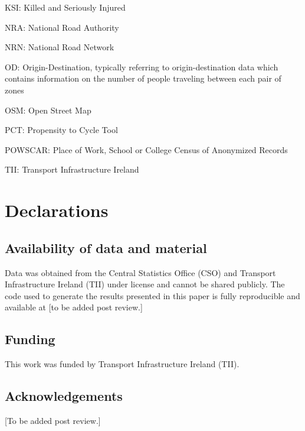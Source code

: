 \documentclass[
  super,
  preprint,
  3p]{elsarticle}
\providecommand{\DIFaddbegin}{} %
\providecommand{\DIFaddend}{} %
\providecommand{\DIFdelbegin}{} %
\providecommand{\DIFdelend}{} %
\newcommand{\DIFscaledelfig}{0.5}
\newlength{\DIFdelgraphicswidth} %
\newlength{\DIFdelgraphicsheight} %
\newcommand{\DIFaddincludegraphics}[2][]{{\color{blue}\fbox{\DIFOincludegraphics[#1]{#2}}}} %
\newcommand{\DIFdelincludegraphics}[2][]{%
\sbox{\DIFdelgraphicsbox}{\DIFOincludegraphics[#1]{#2}}%
\settoboxwidth{\DIFdelgraphicswidth}{\DIFdelgraphicsbox} %
\settoboxtotalheight{\DIFdelgraphicsheight}{\DIFdelgraphicsbox} %
\scalebox{\DIFscaledelfig}{%
\parbox[b]{\DIFdelgraphicswidth}{\usebox{\DIFdelgraphicsbox}\\[-\baselineskip] \rule{\DIFdelgraphicswidth}{0em}}\llap{\resizebox{\DIFdelgraphicswidth}{\DIFdelgraphicsheight}{%
\setlength{\unitlength}{\DIFdelgraphicswidth}%
\begin{picture}(1,1)%
\thicklines\linethickness{2pt} %
{\color[rgb]{1,0,0}\put(0,0){\framebox(1,1){}}}%
{\color[rgb]{1,0,0}\put(0,0){\line( 1,1){1}}}%
{\color[rgb]{1,0,0}\put(0,1){\line(1,-1){1}}}%
\end{picture}%
}\hspace*{3pt}}} %
} %
\DeclareRobustCommand{\DIFaddbegin}{\DIFOaddbegin \let\includegraphics\DIFaddincludegraphics} %
\DeclareRobustCommand{\DIFaddend}{\DIFOaddend \let\includegraphics\DIFOincludegraphics} %
\DeclareRobustCommand{\DIFdelbegin}{\DIFOdelbegin \let\includegraphics\DIFdelincludegraphics} %
\DeclareRobustCommand{\DIFdelend}{\DIFOaddend \let\includegraphics\DIFOincludegraphics} %
\begin{document}
KSI: Killed and Seriously Injured

NRA: National Road Authority

NRN: National Road Network

OD: Origin-Destination, typically referring to origin-destination data
which contains information on the number of people traveling between
each pair of zones

OSM: Open Street Map

PCT: Propensity to Cycle Tool

POWSCAR: Place of Work, School or College Census of Anonymized Records

TII: Transport Infrastructure Ireland

\section{Declarations}\label{declarations}

\subsection*{Availability of data and
material}\label{availability-of-data-and-material}

Data was obtained from the Central Statistics Office (CSO) and Transport
Infrastructure Ireland (TII) under license and cannot be shared
publicly. The code used to generate the results presented in this paper
is fully reproducible and available at {[}to be added post review.{]}

\subsection*{Funding}\label{funding}

This work was funded by Transport Infrastructure Ireland (TII).

\subsection*{Acknowledgements}\label{acknowledgements}

{[}To be added post review.{]}


  \DIFdelbegin %
\DIFdelend \DIFaddbegin 
\DIFaddend 
\end{document}
